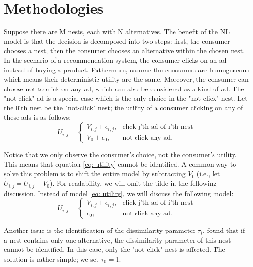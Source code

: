 \documentclass[12pt]{article}
\theoremstyle{definition}
\begin{document}
\begin{sloppypar}
\section{Methodologies}
Suppose there are M nests, each with N alternatives. The benefit of the NL model is that the decision is decomposed into two steps: first, the consumer chooses a nest, then the consumer chooses an alternative within the chosen nest. In the scenario of a recommendation system, the consumer clicks on an ad instead of buying a product. Futhermore, assume the consumers are homogeneous which means their deterministic utility are the same. Moreover, the consumer can choose not to click on any ad, which can also be considered as a kind of ad. The "not-click" ad is a special case which is the only choice in the "not-click" nest. Let the 0'th nest be the "not-click" nest; the utility of a consumer clicking on any of these ads is as follows:
\begin{equation}\label{eq: utility}
    U_{i,j} = 
    \begin{cases}
        V_{i,j} + \epsilon_{i,j}, &\text{click j'th ad of i'th nest} \\
        V_0 + \epsilon_0, &\text{not click any ad}.     
    \end{cases}
\end{equation}

Notice that we only observe the consumer's choice, not the consumer's utility. This means that equation \ref{eq: utility} cannot be identified. A common way to solve this problem is to shift the entire model by subtracting $V_0$ (i.e., let $\tilde{U}_{i,j} = U_{i,j} - V_0$).
For readability, we will omit the tilde in the following discussion. Instead of model \ref{eq: utility}, we will discuss the following model:
\begin{equation}\label{eq: utility2}
    U_{i,j} = 
    \begin{cases}
        V_{i,j} + \epsilon_{i,j}, &\text{click j'th ad of i'th nest} \\
        \epsilon_0, &\text{not click any ad}.     
    \end{cases}
\end{equation}

Another issue is the identification of the dissimilarity parameter $\tau_i$. \textcite{heiss} found that if a nest contains only one alternative, the dissimilarity parameter of this nest cannot be identified. In this case, only the "not-click" nest is affected. The solution is rather simple; we set $\tau_0=1$.


\end{sloppypar}
\end{document}
